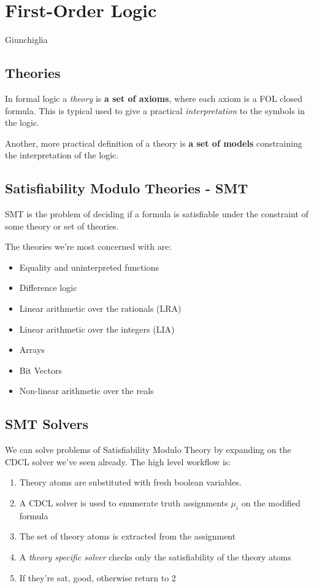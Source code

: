 \documentclass{article}
\begin{document}
\section{First-Order Logic}
Giunchiglia
\subsection{Theories} 
In formal logic a \textit{theory} is \textbf{a set of axioms}, where each axiom is a FOL closed formula. This is typical used to give a practical \textit{interpretation} to the symbols in the logic.

Another, more practical definition of a theory is \textbf{a set of models} constraining the interpretation of the logic.

\subsection{Satisfiability Modulo Theories - SMT}
SMT is the problem of deciding if a formula is satisfiable under the constraint of some theory or set of theories.

The theories we're most concerned with are:
\begin{itemize}
    \item Equality and uninterpreted functions
    \item Difference logic
    \item Linear arithmetic over the rationals (LRA)
    \item Linear arithmetic over the integers (LIA)
    \item Arrays
    \item Bit Vectors
    \item Non-linear arithmetic over the reals
\end{itemize}

\subsection{SMT Solvers}
We can solve problems of Satisfiability Modulo Theory by expanding on the CDCL solver we've seen already. The high level workflow is:
\begin{enumerate}
    \item Theory atoms are substituted with fresh boolean variables.
    \item A CDCL solver is used to enumerate truth assignments $\mu_i$ on the modified formula
    \item The set of theory atoms is extracted from the assignment
    \item A \textit{theory specific solver} checks only the satisfiability of the theory atoms
    \item If they're sat, good, otherwise return to 2
\end{enumerate}
\end{document}
